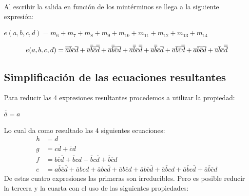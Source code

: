 Al escribir la salida en función de los mintérminos se llega a la siguiente expresión:
\centerline{$e(a,b,c,d)=m_{6}+m_{7}+m_{8}+m_{9}+m_{10}+m_{11}+m_{12}+m_{13}+m_{14}$}
\begin{equation}
	\centerline{$e(a,b,c,d)=\overline{\overline{a}}\overline{b}\overline{c}\overline{d}+\overline{a}\overline{\overline{b}}\overline{\overline{c}}\overline{\overline{d}}+\overline{a}\overline{\overline{b}}\overline{\overline{c}}\overline{d}+\overline{a}\overline{\overline{b}}\overline{c}\overline{\overline{d}}+\overline{a}\overline{\overline{b}}\overline{c}\overline{d}+\overline{a}\overline{b}\overline{\overline{c}}\overline{\overline{d}}+\overline{a}\overline{b}\overline{\overline{c}}\overline{d}+\overline{a}\overline{b}\overline{c}\overline{\overline{d}}$}
\end{equation}
\subsection{Simplificación de las ecuaciones resultantes}
\hspace{10mm} Para reducir las 4 expresiones resultantes procedemos a utilizar la propiedad:
\centerline{$\overline{\overline{a}}=a$}
Lo cual da como resultado las 4 siguientes ecuaciones:
\begin{align*}
	h & = d                                                                                                                                                                                                                                                        \\
	g & = c\overline{d}+\overline{c}d                                                                                                                                                                                                                              \\
	f & = b\overline{c}\overline{d}+\overline{b}cd+\overline{b}c\overline{d}+\overline{b}\overline{c}d                                                                                                                                                             \\
	e & = a\overline{b}\overline{c}\overline{d}+\overline{a}bcd+\overline{a}bc\overline{d}+\overline{a}b\overline{c}d+\overline{a}b\overline{c}\overline{d}+\overline{a}\overline{b}cd+\overline{a}\overline{b}c\overline{d}+\overline{a}\overline{b}\overline{c}d 
\end{align*}
De estas cuatro expresiones las primeras son irreducibles. Pero es posible reducir la tercera y la cuarta con el uso de las siguientes propiedades:
